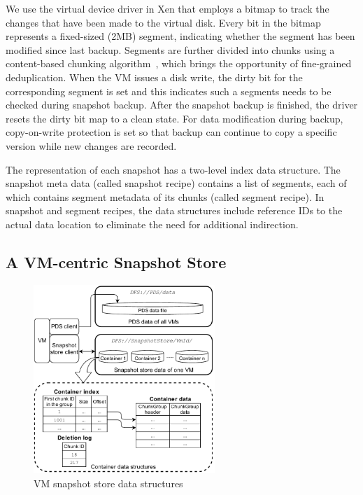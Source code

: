 We use the virtual device driver in Xen that employs a bitmap to track the changes 
that have been made to the virtual disk.
Every bit in the bitmap represents a fixed-sized (2MB) segment, indicating whether the segment
has been modified since last backup. 
Segments are further divided into chunks 
using a content-based chunking algorithm~\cite{frame05}, 
which brings the opportunity of fine-grained deduplication.
When the VM issues a disk write, the dirty bit for the corresponding segment is set
and this indicates such a segments needs to be checked during snapshot backup. 
After the snapshot backup is finished, the driver resets the dirty bit map to a clean state.
For data modification during backup, copy-on-write protection is set so that backup can continue to
copy  a specific version while new changes are recorded.

The representation of each snapshot has  a two-level index data structure.
The snapshot meta data (called snapshot recipe) contains a list of segments, each of which contains segment
metadata of its chunks (called segment recipe).
In snapshot and segment recipes, 
the data structures  include reference IDs to the actual data location to eliminate the need for additional indirection.


\subsection{A VM-centric Snapshot Store}
\label{sect:store}

\begin{figure}[htbp]
  \centering
  \includegraphics[width=2.7in]{images/sstore_arch}
  \centering
  \caption{VM snapshot store data structures}
  \label{fig:as_arch}
\end{figure}

